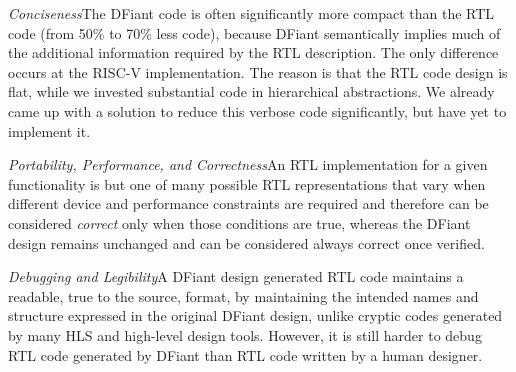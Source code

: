 \emph{Conciseness}\quad The DFiant code is often significantly more compact than the RTL code (from 50\% to 70\% less code), because DFiant semantically implies much of the additional information required by the RTL description. The only difference occurs at the RISC-V implementation. The reason is that the RTL code design is flat, while we invested substantial code in hierarchical abstractions. We already came up with a solution to reduce this verbose code significantly, but have yet to implement it.  

\emph{Portability, Performance, and Correctness}\quad An RTL implementation for a given functionality is but one of many possible RTL representations that vary when different device and performance constraints are required and therefore can be considered \textit{correct} only when those conditions are true, whereas the DFiant design remains unchanged and can be considered always correct once verified. 

\emph{Debugging and Legibility}\quad A DFiant design generated RTL code maintains a readable, true to the source, format, by maintaining the intended names and structure expressed in the original DFiant design, unlike cryptic codes generated by many HLS and high-level design tools. However, it is still harder to debug RTL code generated by DFiant than RTL code written by a human designer.




